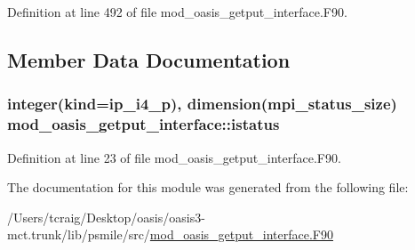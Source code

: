 Definition at line 492 of file mod\+\_\+oasis\+\_\+getput\+\_\+interface.\+F90.



\subsection{Member Data Documentation}
\hypertarget{classmod__oasis__getput__interface_a2ceaaa5740216799f651b8dacb42b239}{
\subsubsection[{istatus}]{\setlength{\rightskip}{0pt plus 5cm}integer(kind=ip\+\_\+i4\+\_\+p), dimension(mpi\+\_\+status\+\_\+size) mod\+\_\+oasis\+\_\+getput\+\_\+interface\+::istatus\hspace{0.3cm}{\ttfamily [private]}}}\label{classmod__oasis__getput__interface_a2ceaaa5740216799f651b8dacb42b239}


Definition at line 23 of file mod\+\_\+oasis\+\_\+getput\+\_\+interface.\+F90.



The documentation for this module was generated from the following file\+:\begin{DoxyCompactItemize}
\item 
/\+Users/tcraig/\+Desktop/oasis/oasis3-\/mct.\+trunk/lib/psmile/src/\hyperlink{mod__oasis__getput__interface_8_f90}{mod\+\_\+oasis\+\_\+getput\+\_\+interface.\+F90}\end{DoxyCompactItemize}
